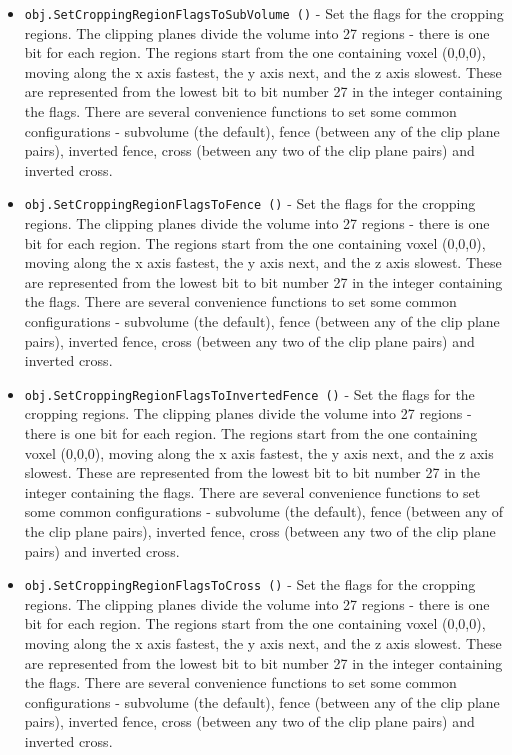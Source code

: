 \begin{itemize}
\item  \verb|obj.SetCroppingRegionFlagsToSubVolume ()| -  Set the flags for the cropping regions. The clipping planes divide the
 volume into 27 regions - there is one bit for each region. The regions 
 start from the one containing voxel (0,0,0), moving along the x axis 
 fastest, the y axis next, and the z axis slowest. These are represented 
 from the lowest bit to bit number 27 in the integer containing the 
 flags. There are several convenience functions to set some common 
 configurations - subvolume (the default), fence (between any of the 
 clip plane pairs), inverted fence, cross (between any two of the 
 clip plane pairs) and inverted cross.

\item  \verb|obj.SetCroppingRegionFlagsToFence ()| -  Set the flags for the cropping regions. The clipping planes divide the
 volume into 27 regions - there is one bit for each region. The regions 
 start from the one containing voxel (0,0,0), moving along the x axis 
 fastest, the y axis next, and the z axis slowest. These are represented 
 from the lowest bit to bit number 27 in the integer containing the 
 flags. There are several convenience functions to set some common 
 configurations - subvolume (the default), fence (between any of the 
 clip plane pairs), inverted fence, cross (between any two of the 
 clip plane pairs) and inverted cross.

\item  \verb|obj.SetCroppingRegionFlagsToInvertedFence ()| -  Set the flags for the cropping regions. The clipping planes divide the
 volume into 27 regions - there is one bit for each region. The regions 
 start from the one containing voxel (0,0,0), moving along the x axis 
 fastest, the y axis next, and the z axis slowest. These are represented 
 from the lowest bit to bit number 27 in the integer containing the 
 flags. There are several convenience functions to set some common 
 configurations - subvolume (the default), fence (between any of the 
 clip plane pairs), inverted fence, cross (between any two of the 
 clip plane pairs) and inverted cross.

\item  \verb|obj.SetCroppingRegionFlagsToCross ()| -  Set the flags for the cropping regions. The clipping planes divide the
 volume into 27 regions - there is one bit for each region. The regions 
 start from the one containing voxel (0,0,0), moving along the x axis 
 fastest, the y axis next, and the z axis slowest. These are represented 
 from the lowest bit to bit number 27 in the integer containing the 
 flags. There are several convenience functions to set some common 
 configurations - subvolume (the default), fence (between any of the 
 clip plane pairs), inverted fence, cross (between any two of the 
 clip plane pairs) and inverted cross.


\end{itemize}
